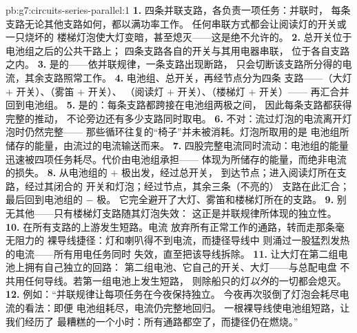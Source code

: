 \begin{solution}{pb:g7:circuits-series-parallel:1}
\textbf{1.} 四条并联支路，各负责一项任务：并联时，
每条支路无论其他支路如何，都以满功率工作。
任何串联方式都会让阅读灯的开关或一只烧坏的
楼梯灯泡使大灯变暗，甚至熄灭——这是绝不允许的。
\textbf{2.} 总开关位于电池组之后的公共干路上；
四条支路各自的开关与其用电器串联，
位于各自支路之内。
\textbf{3.} 是的——依并联规律，一条支路出现断路，
只会切断该支路所分得的电流，其余支路照常工作。
\textbf{4.} 电池组、总开关，再经节点分为四条
支路——（大灯 $+$ 开关）、（雾笛 $+$ 开关）、
（阅读灯 $+$ 开关）、（楼梯灯 $+$ 开关）——
再汇合并回到电池组。
\textbf{5.} 是的：每条支路都跨接在电池组两极之间，
因此每条支路都获得完整的推动，
不论旁边还有多少支路同时取电。
\textbf{6.} 不对：流过灯泡的电流离开灯泡时仍然完整——
那些循环往复的“椅子”并未被消耗。灯泡所取用的是
电池组所储存的能量，由流过的电流输送而来。
\textbf{7.} 四股完整电流同时流动：电池组的能量
迅速被四项任务耗尽。代价由电池组承担——
体现为所储存的能量，而绝非电流的损失。
\textbf{8.} 从电池组的 $+$ 极出发，经过总开关，
到达节点；进入阅读灯所在支路，经过其闭合的
开关和灯泡；经过节点，其余三条（不亮的）
支路在此汇合；最后回到电池组的 $-$ 极。
它完全避开了大灯、雾笛和楼梯灯所在的支路。
\textbf{9.} 别无其他——只有楼梯灯支路随其灯泡失效：
这正是并联规律所体现的独立性。
\textbf{10.} 在所有支路的上游发生短路。电流
放弃所有正常工作的通路，转而走那条毫无阻力的
裸导线捷径：灯和喇叭得不到电流，而捷径导线中
则涌过一股猛烈发热的电流——所有用电任务同时
失效，直至把该导线拆除。
\textbf{11.} 让大灯在第二组电池上拥有自己独立的回路：
第二组电池、它自己的开关、大灯——与总配电盘
不共用任何导线。若第一组电池上发生短路，
则除船只的灯\emph{以外}的一切都会熄灭。
\textbf{12.} 例如：“并联规律让每项任务在今夜保持独立。
今夜再次驳倒了灯泡会耗尽电流的看法：即便
电池组耗尽，电流仍完整地回归。
一根裸导线使电池组短路，让我们经历了
最糟糕的一个小时：所有通路都空了，而捷径仍在燃烧。”
\end{solution}
